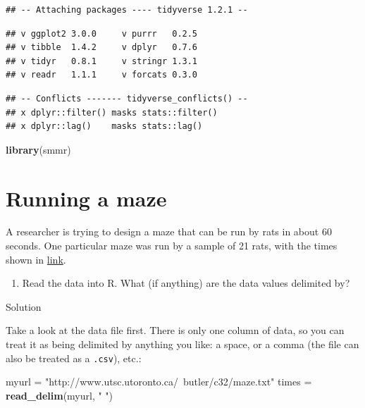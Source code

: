 \documentclass[]{tufte-book}
\newenvironment{Shaded}{}{}
\newcommand{\KeywordTok}[1]{\textcolor[rgb]{0.00,0.44,0.13}{\textbf{#1}}}
\newcommand{\NormalTok}[1]{#1}
\newcommand{\StringTok}[1]{\textcolor[rgb]{0.25,0.44,0.63}{#1}}
\providecommand{\tightlist}{%
  \setlength{\itemsep}{0pt}\setlength{\parskip}{0pt}}
\theoremstyle{definition}
\theoremstyle{definition}
\theoremstyle{definition}
\theoremstyle{remark}
\begin{document}
\begin{verbatim}
## -- Attaching packages ---- tidyverse 1.2.1 --
\end{verbatim}

\begin{verbatim}
## v ggplot2 3.0.0     v purrr   0.2.5
## v tibble  1.4.2     v dplyr   0.7.6
## v tidyr   0.8.1     v stringr 1.3.1
## v readr   1.1.1     v forcats 0.3.0
\end{verbatim}

\begin{verbatim}
## -- Conflicts ------- tidyverse_conflicts() --
## x dplyr::filter() masks stats::filter()
## x dplyr::lag()    masks stats::lag()
\end{verbatim}

\begin{Shaded}
\begin{Highlighting}[]
\KeywordTok{library}\NormalTok{(smmr)}
\end{Highlighting}
\end{Shaded}

\hypertarget{running-a-maze}{%
\section{Running a maze}\label{running-a-maze}}

A researcher is trying to design a maze that can be run by rats in about
60 seconds. One particular maze was run by a sample of 21 rats, with the
times shown in
\href{http://www.utsc.utoronto.ca/~butler/c32/maze.txt}{link}.

\begin{enumerate}
\def\labelenumi{(\alph{enumi})}
\tightlist
\item
  Read the data into R. What (if anything) are the data values delimited
  by?
\end{enumerate}

Solution

Take a look at the data file first. There is only one column of data, so
you can treat it as being delimited by anything you like: a space, or a
comma (the file can also be treated as a \texttt{.csv}), etc.:

\begin{Shaded}
\begin{Highlighting}[]
\NormalTok{myurl =}\StringTok{ "http://www.utsc.utoronto.ca/~butler/c32/maze.txt"}
\NormalTok{times =}\StringTok{ }\KeywordTok{read_delim}\NormalTok{(myurl, }\StringTok{" "}\NormalTok{)}
\end{Highlighting}
\end{Shaded}
\end{document}
